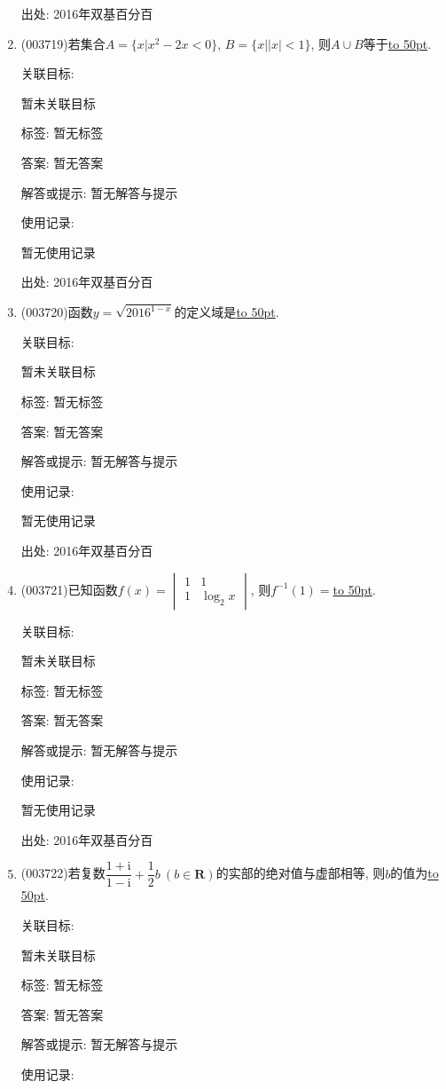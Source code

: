 \documentclass[10pt,a4paper]{article}
\newcommand{\blank}[1]{\underline{\hbox to #1pt{}}}
\begin{document}
\begin{enumerate}[1.]
出处: 2016年双基百分百
\item { (003719)}若集合$A=\{x|x^2-2x<0\}$, $B=\{x||x|<1\}$, 则$A\cup B$等于\blank{50}.


关联目标:

暂未关联目标



标签: 暂无标签

答案: 暂无答案

解答或提示: 暂无解答与提示

使用记录:

暂无使用记录


出处: 2016年双基百分百
\item { (003720)}函数$y=\sqrt{2016^{1-x}}$的定义域是\blank{50}.


关联目标:

暂未关联目标



标签: 暂无标签

答案: 暂无答案

解答或提示: 暂无解答与提示

使用记录:

暂无使用记录


出处: 2016年双基百分百
\item { (003721)}已知函数$f(x)=\begin{vmatrix}
1&1\\1&\log_2 x
\end{vmatrix}$, 则$f^{-1}(1)=$\blank{50}.


关联目标:

暂未关联目标



标签: 暂无标签

答案: 暂无答案

解答或提示: 暂无解答与提示

使用记录:

暂无使用记录


出处: 2016年双基百分百
\item { (003722)}若复数$\dfrac{1+\mathrm{i}}{1-\mathrm{i}}+\dfrac 12 b \ (b\in \mathbf{R})$的实部的绝对值与虚部相等, 则$b$的值为\blank{50}.


关联目标:

暂未关联目标



标签: 暂无标签

答案: 暂无答案

解答或提示: 暂无解答与提示

使用记录:


\end{enumerate}
\end{document}
